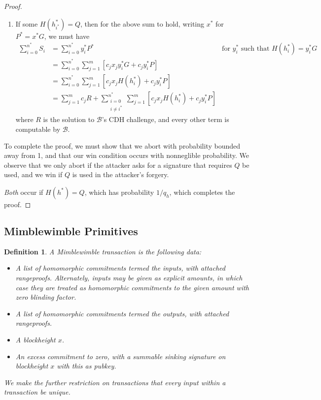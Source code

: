 \documentclass[letterpaper]{article}
\newtheorem{defn}{Definition}
\begin{document}
\begin{proof}
\begin{enumerate}
\item If some $H(h_{i^*}^*) = Q$, then for the above sum to hold, writing $x^*$
for $P^* = x^*G$, we must have
\begin{align*}
\sum_{i=0}^{n^*} S_i
    &= \sum_{i=0}^{n^*} y^*_iP^* &\text{for $y^*_i$ such that $H(h^*_i) = y^*_iG$}	\\
    &= \sum_{i=0}^{n^*} \sum_{j=1}^m [c_jx_jy^*_iG + c_jy^*_iP]	\\
    &= \sum_{i=0}^{n^*} \sum_{j=1}^m [c_jx_jH(h^*_i) + c_jy^*_iP] 	\\
    &= \sum_{j=1}^m c_j R + \sum_{\substack{i=0\\i\neq i^*}}^{n^*} \sum_{j=1}^m [c_jx_jH(h^*_i) + c_jy^*_iP]
\end{align*}
where $R$ is the solution to $\mathcal{B}$'s CDH challenge, and every other
term is computable by $\mathcal{B}$.
\end{enumerate}

To complete the proof, we must show that we abort with probability bounded
away from 1, and that our win condition occurs with nonneglible probability.
We observe that we only  abort if the attacker asks for a signature that
requires $Q$ be used, and we win if $Q$ is used in the attacker's forgery.

\emph{Both} occur if $H(h^*) = Q$, which has probability $1/q_h$, which
completes the proof.
\end{proof}

\subsection{Mimblewimble Primitives}

\begin{defn}A \emph{Mimblewimble transaction} is the following data:
\begin{itemize}
\item A list of homomorphic commitments termed the \emph{inputs},
with attached rangeproofs. Alternately, inputs may be given as
explicit amounts, in which case they are treated as homomorphic
commitments to the given amount with zero blinding factor.
\item A list of homomorphic commitments termed the \emph{outputs},
with attached rangeproofs.
\item A blockheight $x$.
\item An \emph{excess} commitment to zero, with a summable sinking
signature on blockheight $x$ with this as pubkey.
\end{itemize}
We make the further restriction on transactions that every input
within a transaction be unique.\label{defn:tx}
\end{defn}
\end{document}
